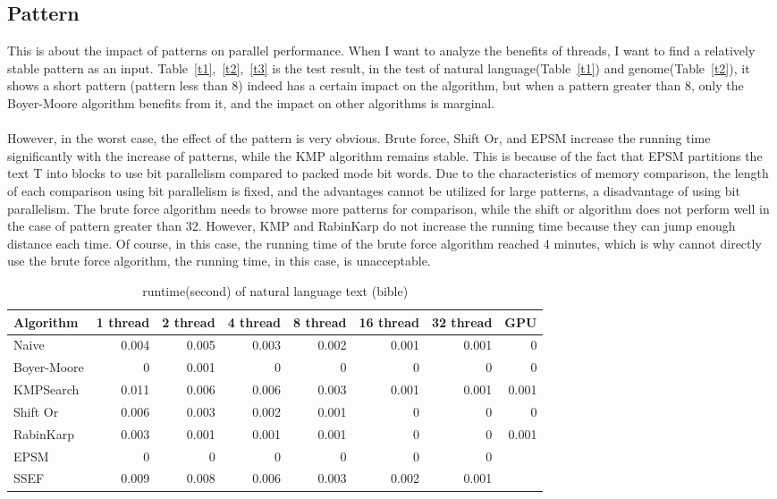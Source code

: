 \documentclass[11pt]{article}       %
\begin{document}
\subsection{Pattern}\label{pf}



This is about the impact of patterns on parallel performance. When I want to analyze the benefits of threads, I want to find a relatively stable pattern as an input. Table~\ref{t1},~\ref{t2},~\ref{t3} is the test result,  in the test of natural language(Table~\ref{t1}) and genome(Table~\ref{t2}), it shows a short pattern (pattern less than 8)  indeed has a certain impact on the algorithm, but when a pattern greater than 8, only the Boyer-Moore algorithm benefits from it, and the impact on other algorithms is marginal. \\
\\However, in the worst case, the effect of the pattern is very obvious. Brute force, Shift Or, and EPSM increase the running time significantly with the increase of patterns, while the KMP algorithm remains stable. This is because of the fact that EPSM partitions the text T into blocks to use bit parallelism compared to packed mode bit words. Due to the characteristics of memory comparison, the length of each comparison using bit parallelism is fixed, and the advantages cannot be utilized for large patterns, a disadvantage of using bit parallelism. The brute force algorithm needs to browse more patterns for comparison, while the shift or algorithm does not perform well in the case of pattern greater than 32. However, KMP and RabinKarp do not increase the running time because they can jump enough distance each time. Of course, in this case, the running time of the brute force algorithm reached 4 minutes, which is why cannot directly use the brute force algorithm, the running time, in this case, is unacceptable.





\begin{table}[htbp]
  \centering
  \caption{runtime(second) of natural language text (bible)}
    \begin{tabular}{lrrrrrrr}\label{t4}
Algorithm & 1 thread & 2 thread & 4 thread & 8 thread & 16 thread & 32 thread & GPU \\
 \hline
    Naive & 0.004 & 0.005 & 0.003 & 0.002 & 0.001 & 0.001 & 0 \\
    {Boyer-Moore} & 0     & 0.001 & 0     & 0     & 0     & 0     & 0 \\
    KMPSearch & 0.011 & 0.006 & 0.006 & 0.003 & 0.001 & 0.001 & 0.001 \\
    Shift Or & 0.006 & 0.003 & 0.002 & 0.001 & 0     & 0     & 0 \\
    RabinKarp & 0.003 & 0.001 & 0.001 & 0.001 & 0     & 0     & 0.001 \\
    EPSM  & 0     & 0     & 0     & 0     & 0     & 0     &  \\
    SSEF  & 0.009 & 0.008 & 0.006 & 0.003 & 0.002 & 0.001 &  \\
    \end{tabular}%
  \label{tab:addlabel}%
\end{table}%
\end{document}
